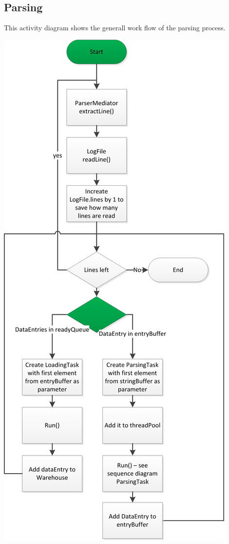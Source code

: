 \newpage 

\subsection{Parsing} 
This activity diagram shows the generall work flow of the parsing process. 
\begin{center}
\includegraphics[width=1\linewidth]{Pictures/Seq/ActiParser.png}  
\end{center}

